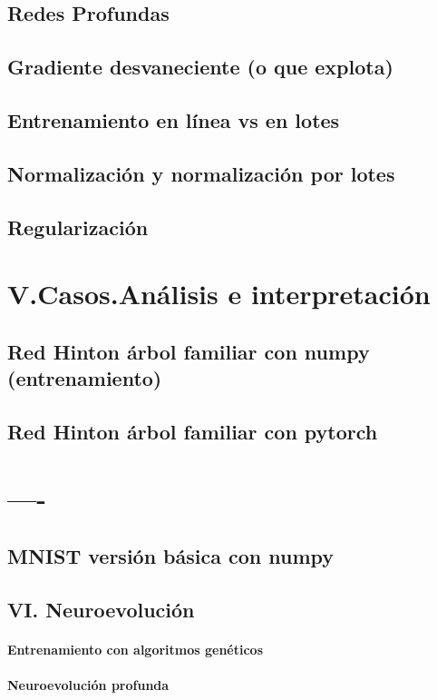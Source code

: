 \documentclass[12pt,openany]{book}
\begin{document}
\section{Redes Profundas}
\section{Gradiente desvaneciente (o que explota)}
\section{Entrenamiento en línea vs en lotes}
\section{Normalización y normalización por lotes}
\section{Regularización}

\chapter{V.Casos.Análisis e interpretación}%
\section{Red Hinton árbol familiar con numpy (entrenamiento)}
\section{Red Hinton árbol familiar con pytorch}

\chapter{----}%
\section{MNIST versión básica con numpy}
\section{VI. Neuroevolución}
\subsubsection{Entrenamiento con algoritmos genéticos}
\subsubsection{Neuroevolución profunda}
\end{document}
